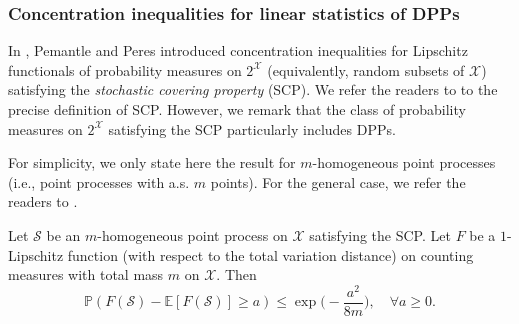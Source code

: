 \begin{comment}
\begin{proof}
    By direct computation, one has
\[ \mathbb E[\Lambda_{\mathcal S}(f)] = \sum_{x\in \mathcal X} f(x) \mathbb P(x\in \mathbb S) = \mathbb E[\Lambda_{\mathcal S_\poi}(f)] \]
and
\begin{eqnarray*}
    \mathbb E [\Lambda_{\mathcal S}(f)^2] &=& \mathbb E \Big [ \sum_{x\in\mathcal S} f(x)^2 + \sum_{x \neq y \in \mathcal S} f(x)f(y)\Big ] \\
    &=& \mathbb E \Big [ \sum_{x\in\mathcal S} f(x)^2 \Big ] + \mathbb E \Big [ \sum_{x \neq y \in \mathcal S} f(x)f(y)\Big ] \\
    &=& \sum_{x\in \mathcal X} f(x)^2 \mathbb P(x\in\mathcal S) + \sum_{x\neq y \in \mathcal X} f(x)f(y) \mathbb P(x\in \mathcal S, y \in \mathcal S) \\
    &\le& \sum_{x\in \mathcal X} f(x)^2 \mathbb P(x\in\mathcal S) + \sum_{x\neq y \in \mathcal X} f(x)f(y) \mathbb P(x\in \mathcal S)\mathbb P(y \in \mathcal S) \\
    &=& \mathbb E[\Lambda_{\mathcal S_\poi}(f)^2],
\end{eqnarray*}
which implies 
$\var[\Lambda_{\mathcal S}(f)] \le \var[\Lambda_{\mathcal S_\poi}(f)]$ as desired.
\end{proof}

Proposition \ref{p:var-reduction} provides a hint about the potential of sampling with negative dependent processes. However, applying this to the context of coresets requires more than just that.
\end{comment}




\subsubsection{Concentration inequalities for linear statistics of DPPs}

In \cite{PEMANTLE_PERES_2014}, Pemantle and Peres introduced concentration inequalities for Lipschitz functionals of probability measures on $2^{\mathcal X}$ (equivalently, random subsets of $\mathcal X$) satisfying the \textit{stochastic covering property} (SCP). 
We refer the readers to \cite{PEMANTLE_PERES_2014} to the precise definition of SCP. However, we remark that the class of probability measures on $2^{\mathcal X}$ satisfying the SCP particularly includes DPPs.

For simplicity, we only state here the result for $m$-homogeneous point processes (i.e., point processes with a.s. $m$ points). For the general case, we refer the readers to \cite{PEMANTLE_PERES_2014}.
\begin{theorem} \label{t:concentration-lips}
    Let $\mathcal S$ be an $m$-homogeneous point process on $\mathcal X$ satisfying the SCP. Let $F$ be a $1$-Lipschitz function (with respect to the total variation distance) on counting measures with total mass $m$ on $\mathcal X$. Then
    \[\mathbb P(F(\mathcal S) - \mathbb E[F(\mathcal S)] \ge a ) \le \exp \Big (-\frac{a^2}{8m}\Big), \quad \forall a \ge 0.\]
\end{theorem}

